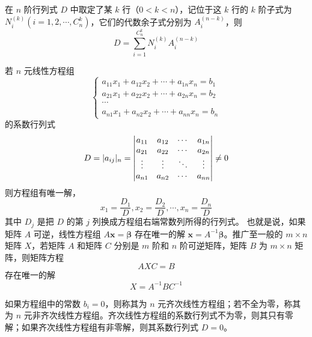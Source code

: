 \documentclass{ctexbook}
\begin{document}
\begin{theorem}[拉普拉斯定理]
    在 $n$ 阶行列式 $D$ 中取定了某 $k$ 行（$0<k<n$），记位于这 $k$ 行的 $k$ 阶子式为 $N_i^{(k)}(i=1,2,\cdots,C_{n}^k)$，它们的代数余子式分别为 $A_i^{(n-k)}$，则
    \begin{equation}
        D=\sum_{i=1}^{C_n^k} N_i^{(k)}A_i^{(n-k)}
    \end{equation}
\end{theorem}

\begin{theorem}[克拉默定理]
    若 $n$ 元线性方程组
    \begin{equation}
        \begin{cases}
            a_{11}x_1+a_{12}x_2+\cdots+a_{1n}x_n=b_1\\
            a_{21}x_1+a_{22}x_2+\cdots+a_{2n}x_n=b_2\\
            \cdots\\
            a_{n1}x_1+a_{n2}x_2+\cdots+a_{nn}x_n=b_n
        \end{cases}
    \end{equation}
    的系数行列式
    \begin{equation}
        D=|a_{ij}|_n=\mqty|a_{11} & a_{12} & \cdots & a_{1n}\\
        a_{21} & a_{22} & \cdots & a_{2n}\\
        \vdots & \vdots & \ddots & \vdots\\
        a_{n1} & a_{n2} & \cdots & a_{nn}|\neq 0
    \end{equation}
    则方程组有唯一解，
    \begin{equation}
        x_1=\frac{D_1}{D}, x_2=\frac{D_2}{D}, \cdots, x_n=\frac{D_n}{D}
    \end{equation}
    其中 $D_j$ 是把 $D$ 的第 $j$ 列换成方程组右端常数列所得的行列式。
    也就是说，如果矩阵 $A$ 可逆，线性方程组 $A\boldsymbol{x}=\boldsymbol{\beta}$ 存在唯一的解 $\boldsymbol{x}=A^{-1}\boldsymbol{\beta}$。推广至一般的 $m\times n$ 矩阵 $X$，若矩阵 $A$ 和矩阵 $C$ 分别是 $m$ 阶和 $n$ 阶可逆矩阵，矩阵 $B$ 为 $m\times n$ 矩阵，则矩阵方程
    \begin{equation}
        AXC=B        
    \end{equation}
    存在唯一的解
    \begin{equation}
        X=A^{-1}BC^{-1}
    \end{equation}
\end{theorem}

\begin{definition}[齐次线性方程组]
    如果方程组中的常数 $b_i=0$，则称其为 $n$ 元齐次线性方程组；若不全为零，称其为 $n$ 元非齐次线性方程组。齐次线性方程组的系数行列式不为零，则其只有零解；如果齐次线性方程组有非零解，则其系数行列式 $D=0$。
\end{definition}
\end{document}

